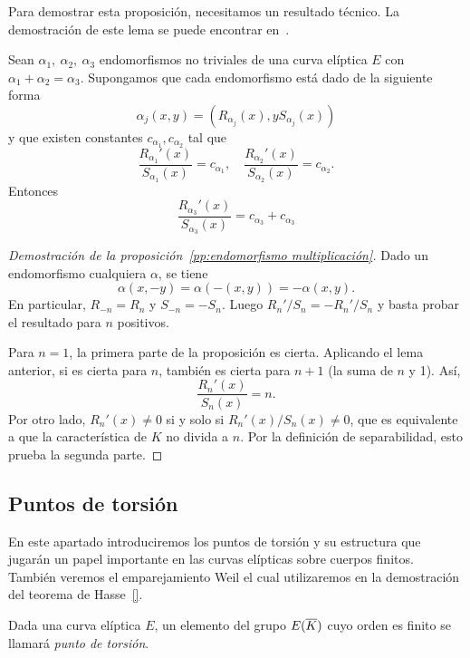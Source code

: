 Para demostrar esta proposición, necesitamos un resultado técnico. La demostración de este lema se puede encontrar en~\cite[sec 2.9]{Washington:2008}.

\begin{lema}\label{lm:cociente derivadas funciones racionales}
	Sean $\alpha_1,\ \alpha_2,\ \alpha_3$ endomorfismos no triviales de una curva elíptica $E$ con $\alpha_1 + \alpha_2 = \alpha_3$. Supongamos que cada endomorfismo está dado de la siguiente forma
	$$
		\alpha_j(x, y) = (R_{\alpha_j}(x), y S_{\alpha_j}(x))
	$$
	y que existen constantes $c_{\alpha_1}, c_{\alpha_2}$ tal que
	$$
		\frac{R_{\alpha_1}'(x)}{S_{\alpha_1}(x)} = c_{\alpha_1}, \quad  \frac{R_{\alpha_2}'(x)}{S_{\alpha_2}(x)} = c_{\alpha_2}.
	$$
	Entonces
	$$
		\frac{R_{\alpha_3}'(x)}{S_{\alpha_3}(x)} = c_{\alpha_3} + c_{\alpha_3}
	$$
\end{lema}

\begin{proof}[Demostración de la proposición~\ref{pp:endomorfismo multiplicación}]
Dado un endomorfismo cualquiera $\alpha$, se tiene
$$
	\alpha(x, -y) = \alpha(-(x, y)) = - \alpha(x, y).
$$
En particular, $R_{-n} = R_n$ y $S_{-n} = -S_n$. Luego $R_n' / S_n = - R_n' / S_n$ y basta probar el resultado para $n$ positivos.

Para $n = 1$, la primera parte de la proposición es cierta. Aplicando el lema anterior, si es cierta para $n$, también es cierta para $n +1$ (la suma de $n$ y 1). Así,
$$
	\frac{R_n'(x)}{S_n(x)} = n.
$$
Por otro lado, $R_n'(x) \neq 0$ si y solo si $R_n'(x) / S_n(x) \neq 0$, que es equivalente a que la característica de $K$ no divida a $n$. Por la definición de separabilidad, esto prueba la segunda parte.
\end{proof}

\subsection{Puntos de torsión}
\label{sub:Puntos de torsión}

En este apartado introduciremos los puntos de torsión y su estructura que jugarán un papel importante en las curvas elípticas sobre cuerpos finitos. También veremos el emparejamiento Weil el cual utilizaremos en la demostración del teorema de Hasse~\ref{}.

\begin{definicion}
	Dada una curva elíptica $E$, un elemento del grupo $E(\overline{K})$ cuyo orden es finito se llamará \emph{punto de torsión}.
\end{definicion}

